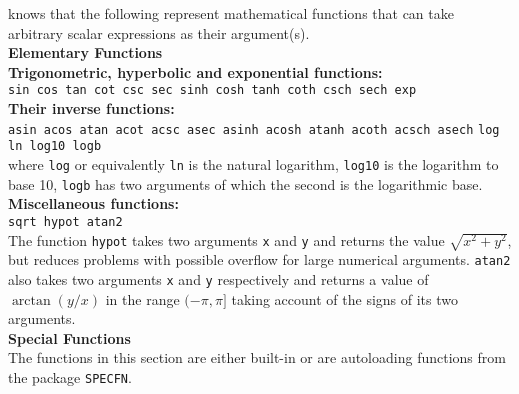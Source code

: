 {\REDUCE} knows that the following represent mathematical functions
 that can
take arbitrary scalar expressions as their argument(s).\\
\textbf{Elementary Functions}\\
\textbf{Trigonometric, hyperbolic and exponential functions:}\\
\texttt{sin cos tan cot csc sec sinh cosh tanh coth csch sech exp}\\
\textbf{Their inverse functions:}\\
\texttt{asin acos atan  acot acsc asec asinh acosh atanh acoth acsch asech}
\texttt{log ln log10 logb}\\
where \texttt{log} or equivalently \texttt{ln} is the natural logarithm,
\texttt{log10} is
the logarithm to base 10,
\texttt{logb} has two arguments of which the second is the logarithmic base.\\
\textbf{Miscellaneous functions:}\\
\texttt{sqrt  hypot  atan2}\\
 The function \texttt{hypot} takes two arguments \texttt{x} and \texttt{y}  and returns the value $\sqrt{x^2+y^2}$, but reduces problems with possible overflow for large  numerical arguments. \texttt{atan2} also takes two arguments \texttt{x} and \texttt{y} respectively and returns a value of $\arctan(y/x)$ in the range $(-\pi, \pi]$ taking account of the signs of its two arguments.
\\
\textbf{Special Functions}\\
The functions in this section are either built-in or are autoloading
functions from the package \texttt{SPECFN}.\\
\hypertarget{operator:Chi}{}
\hypertarget{operator:Ci}{}
\hypertarget{operator:dilog}{}
\hypertarget{operator:Ei}{}
\hypertarget{operator:Erf}{}
\hypertarget{operator:Si}{}
\hypertarget{operator:Shi}{}
\hypertarget{operator:Fresnel_S}{}
\hypertarget{operator:Fresnel_C}{}
\hypertarget{operator:beta}{}
\hypertarget{operator:gamma}{}
\hypertarget{operator:ibeta}{}
\hypertarget{operator:igamma}{}
\hypertarget{operator:polygamma}{}
